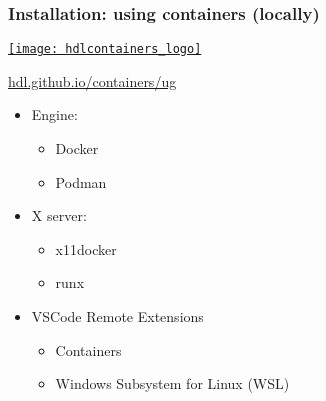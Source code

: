 \documentclass[xcolor={usenames,dvipsnames,svgnames}]{beamer}
\begin{document}
\begin{frame}
\frametitle{Installation: using containers (locally)}
\begin{center}
\begin{minipage}{.2\linewidth}
\href{https://github.com/hdl}{\texttt{[image: hdlcontainers\_logo]}}
\end{minipage}
\begin{minipage}{.45\linewidth}
\href{https://hdl.github.io/containers/ug/index.html}{hdl.github.io/containers/ug}
\end{minipage}
\end{center}

\vfill

\begin{itemize}
\item Engine:
  \begin{itemize}
    \item Docker \href{https://www.docker.com/}{\faGlobe}
    \item Podman \href{https://podman.io/}{\faGlobe}
  \end{itemize}

\vfill

\item X server:
  \begin{itemize}
    \item x11docker \href{https://github.com/mviereck/x11docker/}{\faGithub}
    \item runx \href{https://github.com/mviereck/runx/}{\faGithub}
  \end{itemize}

\vfill

\item VSCode Remote Extensions
  \begin{itemize}
    \item Containers \href{https://marketplace.visualstudio.com/items?itemName=ms-vscode-remote.remote-containers}{\faWindows}
    \item Windows Subsystem for Linux (WSL) \href{https://marketplace.visualstudio.com/items?itemName=ms-vscode-remote.remote-wsl}{\faWindows}
  \end{itemize}
\end{itemize}
\vfill
\end{frame}
\end{document}
